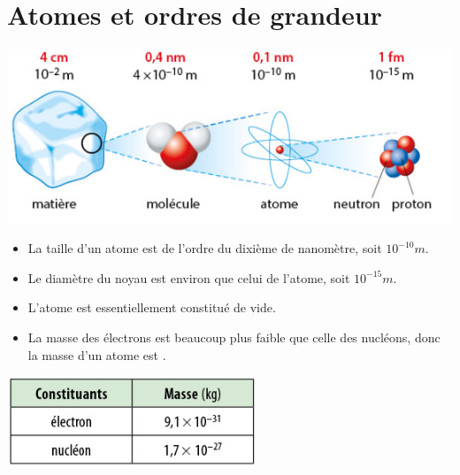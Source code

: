 \documentclass[12pt,a4paper]{article}
\begin{document}
\section{Atomes et ordres de grandeur}

\begin{mybilan}
	
	\begin{center}
		\includegraphics[scale=0.75]{echelle}
	\end{center}

	\begin{itemize}
		\item La taille d'un atome est de l'ordre du dixième de nanomètre, soit $10^{-10} m$.
		\item Le diamètre du noyau est environ  que celui de l'atome, soit $10^{-15} m$.
		\item L'atome est essentiellement constitué de vide.
		\item La masse des électrons est beaucoup plus faible que celle des nucléons, donc la masse d'un atome est .
	\end{itemize}

	
		
		\begin{center}
			\includegraphics[scale=0.75]{masses}
		\end{center}
	
\end{mybilan}
\end{document}
